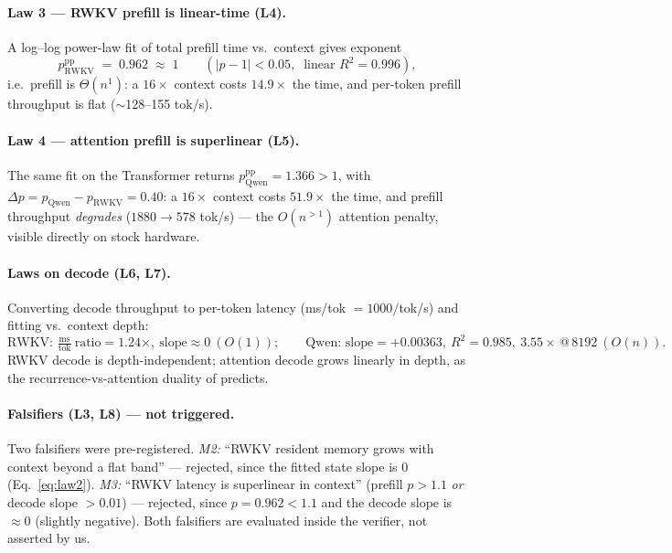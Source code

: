 \documentclass[11pt,a4paper]{article}
\newcommand{\ctx}{\ensuremath{n}}
\begin{document}
\paragraph{Law 3 --- RWKV prefill is linear-time (L4).}
A log--log power-law fit of total prefill time vs.\ context gives exponent
\begin{equation}
\label{eq:law3}
p_{\mathrm{RWKV}}^{\mathrm{pp}} \;=\; 0.962 \;\approx\; 1
\qquad (|p-1| < 0.05,\;\; \text{linear } R^2 = 0.996),
\end{equation}
i.e.\ prefill is \(\Theta(\ctx^1)\): a \(16\times\) context costs \(14.9\times\)
the time, and per-token prefill throughput is flat (\(\sim\)128--155 tok/s).

\paragraph{Law 4 --- attention prefill is superlinear (L5).}
The same fit on the Transformer returns
\(p_{\mathrm{Qwen}}^{\mathrm{pp}} = 1.366 > 1\), with
\(\Delta p = p_{\mathrm{Qwen}} - p_{\mathrm{RWKV}} = 0.40\): a \(16\times\)
context costs \(51.9\times\) the time, and prefill throughput \emph{degrades}
(\(1880 \to 578\) tok/s) --- the \(O(\ctx^{>1})\) attention penalty, visible
directly on stock hardware.

\paragraph{Laws on decode (L6, L7).}
Converting decode throughput to per-token latency (ms/tok \(=1000/\)tok/s) and
fitting vs.\ context depth:
\begin{equation}
\label{eq:law5}
\text{RWKV: } \tfrac{\mathrm{ms}}{\mathrm{tok}}\ \text{ratio} = 1.24\times,\
\text{slope} \approx 0\ (O(1));
\qquad
\text{Qwen: slope} = +0.00363,\ R^2 = 0.985,\ 3.55\times\,@\,\num{8192}\ (O(\ctx)).
\end{equation}
RWKV decode is depth-independent; attention decode grows linearly in depth, as
the recurrence-vs-attention duality of \citet{katharopoulos2020transformers}
predicts.

\paragraph{Falsifiers (L3, L8) --- not triggered.}
Two falsifiers were pre-registered. \emph{M2:} ``RWKV resident memory grows with
context beyond a flat band'' --- rejected, since the fitted state slope is
\(0\) (Eq.~\eqref{eq:law2}). \emph{M3:} ``RWKV latency is superlinear in
context'' (prefill \(p>1.1\) \emph{or} decode slope \(>0.01\)) --- rejected,
since \(p=0.962<1.1\) and the decode slope is \(\approx 0\) (slightly negative).
Both falsifiers are evaluated inside the verifier, not asserted by us.
\end{document}
